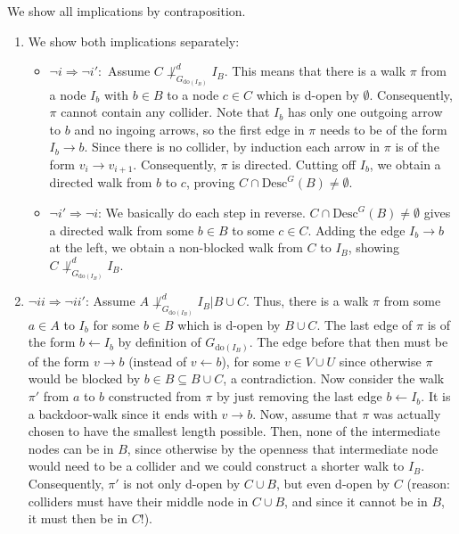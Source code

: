 \begin{enumerate}
\begin{gradedsolution}
  We show all implications by contraposition.
  \begin{enumerate}
    \item We show both implications separately: 
    \begin{itemize}
      \item $\neg i \Rightarrow \neg i':$ Assume $C \not\perp^d_{G_{\text{do}(I_B)}} I_B$. 
      This means that there is a walk $\pi$ from a node $I_b$ with $b \in B$ to a node $c \in C$ which is d-open by $\emptyset$.
      Consequently, $\pi$ cannot contain any collider. 
      Note that $I_b$ has only one outgoing arrow to $b$ and no ingoing arrows, so the first edge in $\pi$ needs to be of the form $I_b \to b$.
      Since there is no collider, by induction each arrow in $\pi$ is of the form $v_i \rightarrow v_{i+1}$.
      Consequently, $\pi$ is directed. 
      Cutting off $I_b$, we obtain a directed walk from $b$ to $c$, proving $C \cap \text{Desc}^G(B) \neq \emptyset$.
      \item $\neg i' \Rightarrow \neg i$: We basically do each step in reverse.
      $C \cap \text{Desc}^G(B) \neq \emptyset$ gives a directed walk from some $b \in B$ to some $c \in C$.
      Adding the edge $I_b \to b$ at the left, we obtain a non-blocked walk from $C$ to $I_B$, showing $C \not\perp^d_{G_{\text{do}(I_B)}} I_B$.
    \end{itemize}
    \item $\neg ii \Rightarrow \neg ii'$: Assume $A \not\perp^d_{G_{\text{do}(I_B)}} I_B | B \cup C$. 
    Thus, there is a walk $\pi$ from some $a \in A$ to $I_b$ for some $b \in B$ which is d-open by $B \cup C$.
    The last edge of $\pi$ is of the form $b \leftarrow I_b$ by definition of $G_{\text{do}(I_B)}$.
    The edge before that then must be of the form $v \rightarrow b$ (instead of $v \leftarrow b$), for some $v \in V \cup U$ since otherwise $\pi$ would be blocked by $b \in B \subseteq B \cup C$, a contradiction.
    Now consider the walk $\pi'$ from $a$ to $b$ constructed from $\pi$ by just removing the last edge $b \leftarrow I_b$.
    It is a backdoor-walk since it ends with $v \rightarrow b$.
    Now, assume that $\pi$ was actually chosen to have the smallest length possible. 
    Then, none of the intermediate nodes can be in $B$, since otherwise by the openness that intermediate node would need to be a collider and we could construct a shorter walk to $I_B$.
    Consequently, $\pi'$ is not only d-open by $C \cup B$, but even d-open by $C$ (reason: colliders must have their middle node in $C \cup B$, and since it cannot be in $B$, it must then be in $C$!).

\end{enumerate}
\end{gradedsolution}
\end{enumerate}
